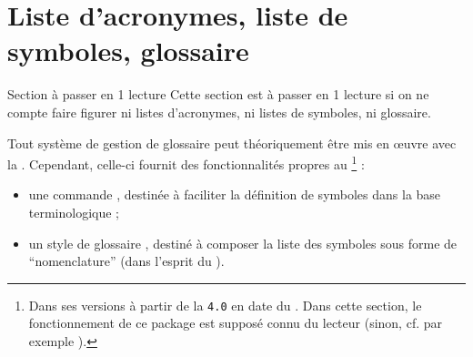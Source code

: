 \section{Liste d'acronymes, liste de symboles,
  glossaire}\label{sec:sigl-gloss-nomencl}

\begin{dbremark*}{Section à passer en 1\iere{} lecture}
  Cette section est à passer en 1\iere{} lecture si on ne compte faire figurer
  ni listes d'acronymes, ni listes de symboles, ni glossaire.
\end{dbremark*}

Tout système de gestion de glossaire peut théoriquement être mis en œuvre avec
la \yatcl. Cependant, celle-ci fournit des fonctionnalités propres au
\footnote{Dans ses versions à partir de la \texttt{4.0} en
  date du . Dans cette section, le fonctionnement de
  ce package est supposé connu du lecteur (sinon, cf. par exemple
  \cite{en-ligne7}).} :
\begin{itemize}
\item une commande , destinée à faciliter la définition de
  symboles dans la base terminologique ;
\item un style de glossaire , destiné à composer la
  liste des symboles sous forme de \enquote{nomenclature} (dans l'esprit du
  ).
\end{itemize}


